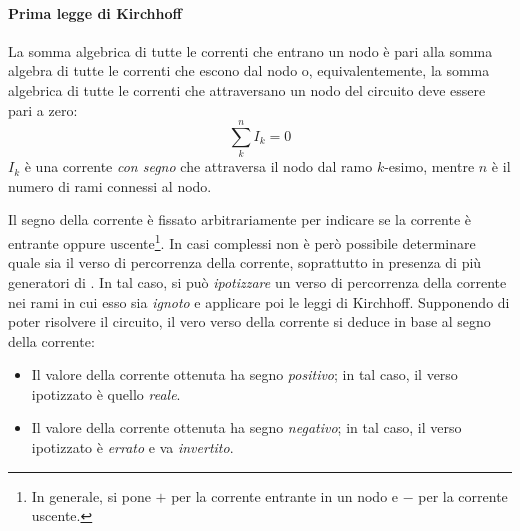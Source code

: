 \paragraph{Prima legge di Kirchhoff}
\begin{theoremaqed}
	La somma algebrica di tutte le correnti che entrano un nodo è pari alla somma algebra di tutte le correnti che escono dal nodo o, equivalentemente, la somma algebrica di tutte le correnti che attraversano un nodo del circuito deve essere pari a zero:
	\begin{equation}
		\sum_k^nI_k=0
	\end{equation}
	$I_k$ è una corrente \textit{con segno} che attraversa il nodo dal ramo $k$-esimo, mentre $n$ è il numero di rami connessi al nodo.
\end{theoremaqed}
Il segno della corrente è fissato arbitrariamente per indicare se la corrente è entrante oppure uscente\footnote{In generale, si pone $+$ per la corrente entrante in un nodo e $-$ per la corrente uscente.}.
In casi complessi non è però possibile determinare quale sia il verso di percorrenza della corrente, soprattutto in presenza di più generatori di \fem. In tal caso, si può \textit{ipotizzare} un verso di percorrenza della corrente nei rami in cui esso sia \textit{ignoto} e applicare poi le leggi di Kirchhoff. Supponendo di poter risolvere il circuito, il vero verso della corrente si deduce in base al segno della corrente:
\begin{itemize}
	\item Il valore della corrente ottenuta ha segno \textit{positivo}; in tal caso, il verso ipotizzato è quello \textit{reale}.
	\item Il valore della corrente ottenuta ha segno \textit{negativo}; in tal caso, il verso ipotizzato è \textit{errato} e va \textit{invertito}.
\end{itemize}
